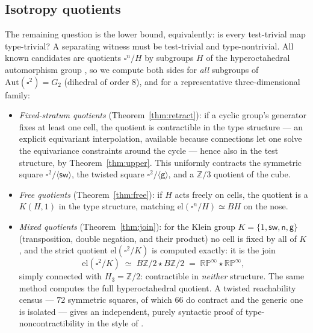\documentclass[11pt]{amsart}
\theoremstyle{definition}
\newcommand{\el}{\mathrm{el}}
\newcommand{\sw}{\mathsf{sw}}
\newcommand{\nb}{\mathsf{n}}
\newcommand{\gtw}{\mathsf{g}}
\newcommand{\Kl}{K}
\begin{document}
\subsection*{Isotropy quotients}
The remaining question is the lower bound, equivalently: is every
test-trivial map type-trivial?  A separating witness must be
test-trivial and type-nontrivial.  All known candidates are
quotients $\square^n/H$ by subgroups $H$ of the hyperoctahedral
automorphism group \cite{PaperL}, so we compute both sides for
\emph{all} subgroups of $\mathrm{Aut}(\square^2) = G_2$
(dihedral of order $8$), and for a representative
three-dimensional family:
\begin{itemize}
\item \emph{Fixed-stratum quotients} (Theorem~\ref{thm:retract}):
  if a cyclic group's generator fixes at least one cell, the
  quotient is contractible in the type structure --- an explicit
  equivariant interpolation, available because connections let one
  solve the equivariance constraints around the cycle --- hence
  also in the test structure, by Theorem~\ref{thm:upper}.  This
  uniformly contracts the symmetric square $\square^2/\langle
  \sw\rangle$, the twisted square $\square^2/\langle
  \gtw\rangle$, and a $\mathbb{Z}/3$ quotient of the cube.
\item \emph{Free quotients} (Theorem~\ref{thm:free}): if $H$ acts
  freely on cells, the quotient is a $K(H,1)$ in the type
  structure, matching $\el(\square^n/H) \simeq BH$ \cite{PaperL}
  on the nose.
\item \emph{Mixed quotients} (Theorem~\ref{thm:join}): for the
  Klein group $\Kl = \{1, \sw, \nb, \gtw\}$ (transposition, double
  negation, and their product) no cell is fixed by all of $\Kl$,
  and the strict quotient $\el(\square^2/\Kl)$ is computed exactly:
  it is the join
  \[
    \el(\square^2/\Kl) \;\simeq\; B\mathbb{Z}/2 \star B\mathbb{Z}/2
    \;=\; \mathbb{RP}^\infty \star \mathbb{RP}^\infty ,
  \]
  simply connected with $H_3 = \mathbb{Z}/2$: contractible in
  \emph{neither} structure.  The same method computes the full
  hyperoctahedral quotient.  A twisted reachability census ---
  $72$ symmetric squares, of which $66$ do contract and the
  generic one is isolated --- gives an independent, purely
  syntactic proof of type-noncontractibility in the style of
  \cite{CoqNote, PaperK}.
\end{itemize}
\end{document}
